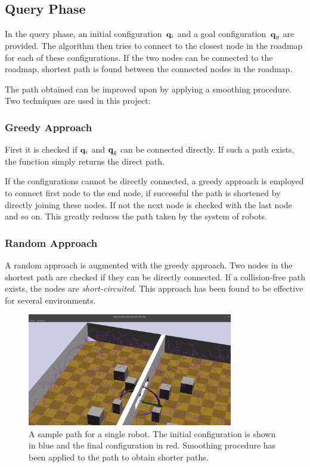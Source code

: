 \documentclass[12pt,a4paper, onecolumn]{IEEEtran}
\begin{document}
\subsection{Query Phase}
In the query phase, an initial configuration~$\mathbf{q}_i$ and a goal configuration~$\mathbf{q}_g$
are provided. The algorithm then tries to connect to the closest node in the roadmap for
each of these configurations. If the two nodes can be connected to the roadmap, shortest
path is found between the connected nodes in the roadmap. 

The path obtained can be improved upon by applying a smoothing procedure. Two techniques
are used in this project:
\subsubsection{Greedy Approach}
First it is checked if $\mathbf{q}_i$ and $\mathbf{q}_g$ can be connected directly. If such a path
exists, the function simply returns the direct path.

If the configurations cannot be directly connected, a greedy approach is employed to
connect first node to the end node, if successful the path is shortened by directly
joining these nodes. If not the next node is checked with the last node and so on. This
greatly reduces the path taken by the system of robots.

\subsubsection{Random Approach}
A random approach is augmented with the greedy approach. Two nodes in the shortest path are checked
if they can be directly connected. If a collision-free path exists, the nodes are {\em
short-circuited}. This approach has been found to be effective for several environments.

\begin{figure}[htbp]
  \centering
  \includegraphics[width=0.8\textwidth]{path_single.png}
  \caption{A sample path for a single robot. The initial configuration is shown in blue
  and the final configuration in red. Smoothing procedure has been applied to the path to
obtain shorter paths.}
  \label{fig:pathS}
\end{figure}
\end{document}

